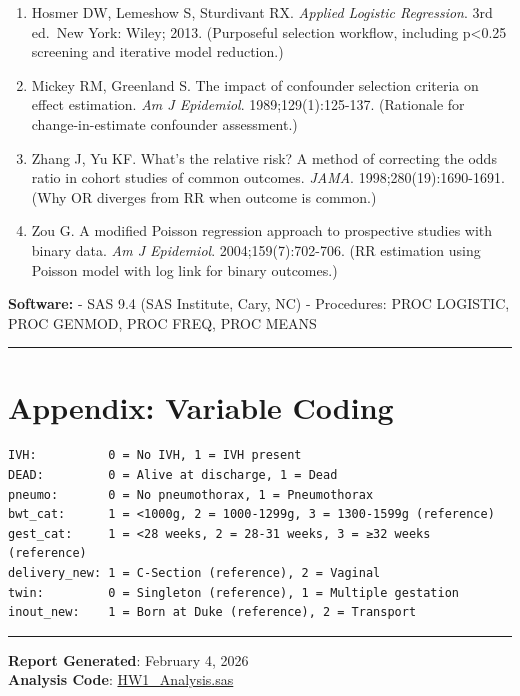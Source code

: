 \documentclass[
]{article}
\providecommand{\tightlist}{%
  \setlength{\itemsep}{0pt}\setlength{\parskip}{0pt}}
\begin{document}
\begin{enumerate}
\def\labelenumi{\arabic{enumi}.}
\tightlist
\item
  Hosmer DW, Lemeshow S, Sturdivant RX. \emph{Applied Logistic
  Regression}. 3rd ed.~New York: Wiley; 2013. (Purposeful selection
  workflow, including p\textless0.25 screening and iterative model
  reduction.)
\item
  Mickey RM, Greenland S. The impact of confounder selection criteria on
  effect estimation. \emph{Am J Epidemiol}. 1989;129(1):125-137.
  (Rationale for change-in-estimate confounder assessment.)
\item
  Zhang J, Yu KF. What's the relative risk? A method of correcting the
  odds ratio in cohort studies of common outcomes. \emph{JAMA}.
  1998;280(19):1690-1691. (Why OR diverges from RR when outcome is
  common.)
\item
  Zou G. A modified Poisson regression approach to prospective studies
  with binary data. \emph{Am J Epidemiol}. 2004;159(7):702-706. (RR
  estimation using Poisson model with log link for binary outcomes.)
\end{enumerate}

\textbf{Software:} - SAS 9.4 (SAS Institute, Cary, NC) - Procedures:
PROC LOGISTIC, PROC GENMOD, PROC FREQ, PROC MEANS

\begin{center}\rule{0.5\linewidth}{0.5pt}\end{center}

\hypertarget{appendix-variable-coding}{%
\section{Appendix: Variable Coding}\label{appendix-variable-coding}}

\begin{verbatim}
IVH:          0 = No IVH, 1 = IVH present
DEAD:         0 = Alive at discharge, 1 = Dead
pneumo:       0 = No pneumothorax, 1 = Pneumothorax
bwt_cat:      1 = <1000g, 2 = 1000-1299g, 3 = 1300-1599g (reference)
gest_cat:     1 = <28 weeks, 2 = 28-31 weeks, 3 = ≥32 weeks (reference)
delivery_new: 1 = C-Section (reference), 2 = Vaginal
twin:         0 = Singleton (reference), 1 = Multiple gestation
inout_new:    1 = Born at Duke (reference), 2 = Transport
\end{verbatim}

\begin{center}\rule{0.5\linewidth}{0.5pt}\end{center}

\textbf{Report Generated}: February 4, 2026\\
\textbf{Analysis Code}: \url{HW1_Analysis.sas}
\end{document}

